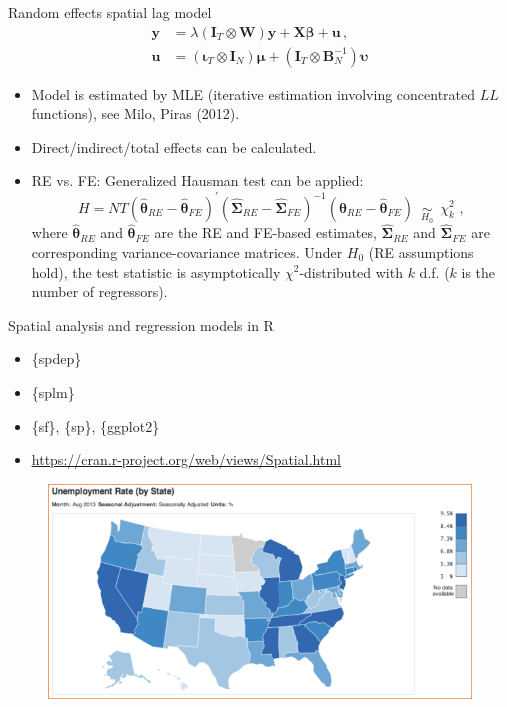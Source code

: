 \documentclass{beamer}
\newcommand{\Ms}[2]{\bm{#1}_{#2}}
\begin{document}
\begin{frame}{Random effects spatial lag model}
    \begin{equation*} 
     \begin{aligned}
      \bm{y}  &= 
      \lambda \left( \Ms{I}{T} \otimes \bm{W} \right) \bm{y} + \bm{X\beta} + \bm{u}\,, \\
      \bm{u} &= 
      \left( \Ms{\iota}{T} \otimes \Ms{I}{N} \right) \bm{\mu} + 
      \left( \Ms{I}{T} \otimes \Ms{B}{N}^{-1} \right) \bm{\upsilon}
     \end{aligned}
    \end{equation*}
\begin{itemize}
    \item Model is estimated by MLE (iterative estimation involving concentrated $LL$ functions), see Milo, Piras (2012).
    \medskip
    \item Direct/indirect/total effects can be calculated.
    \medskip
    \item RE vs. FE: Generalized Hausman test can be applied: 
    \begin{equation*} 
    H = NT \left( \bm{\hat{\theta}}_{RE} - \bm{\hat{\theta}}_{FE} \right)^{\prime}
    \! \left( \bm{\hat{\Sigma}}_{RE} - \bm{\hat{\Sigma}}_{FE} \right)^{-1}
    \! \left( \bm{\hat{\theta}}_{RE} - \bm{\hat{\theta}}_{FE} \right)
    \,\,\, \underset{H_0}{\sim} \,\,\, \chi_k^2 \,\,,
\end{equation*}
where $\bm{\hat{\theta}}_{RE}$ and $\bm{\hat{\theta}}_{FE}$ are the RE and FE-based estimates, $\bm{\hat{\Sigma}}_{RE}$ and $\bm{\hat{\Sigma}}_{FE}$ are corresponding variance-covariance matrices. Under $H_0$ (RE assumptions hold), the test statistic is asymptotically $\chi^2$-distributed with $k$ d.f. ($k$ is the number of regressors).
\end{itemize}
\end{frame}
\begin{frame}{Spatial analysis and regression models in R}
\begin{itemize}
	\item \{spdep\} 
	\item \{splm\}
	\item \{sf\}, \{sp\}, \{ggplot2\}
	\item \textcolor{blue}{\underline{\href{https://cran.r-project.org/web/views/Spatial.html}{https://cran.r-project.org/web/views/Spatial.html}}}
\end{itemize}
 \begin{figure}
 	\includegraphics[width=.7\textwidth]{IMG/sp_unemp.PNG}
 \end{figure}
\end{frame}
\end{document}
